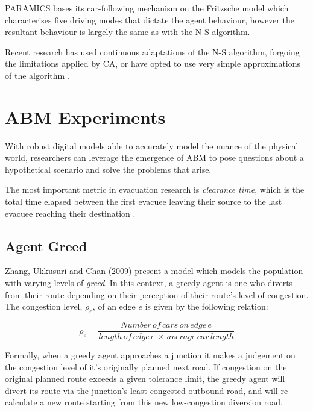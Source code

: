 PARAMICS bases its car-following mechanism on the Fritzsche model \cite{Fritzsche1994ASimulation} which characterises five driving modes that dictate the agent behaviour, however the resultant behaviour is largely the same as with the N-S algorithm. 

Recent research has used continuous adaptations of the N-S algorithm, forgoing the limitations applied by CA, or have opted to use very simple approximations of the algorithm \cite{Durak2015OptimizingAlgorithms,Madireddy2011AnManagement}.


\section{ABM Experiments}

With robust digital models able to accurately model the nuance of the physical world, researchers can leverage the emergence of ABM to pose questions about a hypothetical scenario and solve the problems that arise. 

The most important metric in evacuation research is \textit{clearance time}, which is the total time elapsed between the first evacuee leaving their source to the last evacuee reaching their destination \cite{Shendarkar2006CrowdReality,Madireddy2011AnManagement}.

\subsection{Agent Greed}
Zhang, Ukkusuri and Chan (2009) present a model which models the population with varying levels of \textit{greed}. In this context, a greedy agent is one who diverts from their route depending on their perception of their route's level of congestion. The congestion level, $\rho_e$, of an edge $e$ is given by the following relation:

\BlankLine
\begin{equation}
    \rho_e = \frac{Number\, of\, cars\, on\, edge\, e}{length\, of\, edge\, e\, \times\, average\, car\, length}   
\end{equation}
\BlankLine
\BlankLine

Formally, when a greedy agent approaches a junction it makes a judgement on the congestion level of it's originally planned next road. If congestion on the original planned route exceeds a given tolerance limit, the greedy agent will divert its route via the junction's least congested outbound road, and will re-calculate a new route starting from this new low-congestion diversion road\cite{Zhang2009Agent-basedEvacuation}.

